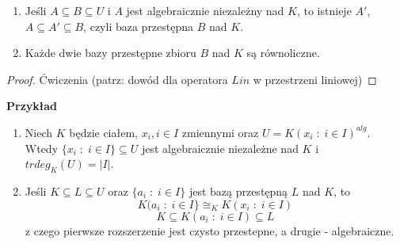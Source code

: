 \begin{theorem}$ $

\begin{enumerate}
    \item Jeśli $A\subseteq B\subseteq U$ i $A$ jest algebraicznie niezależny nad $K$, to istnieje $A'$, $A\subseteq A'\subseteq B$, czyli baza przestępna $B$ nad $K$.
    \item Każde dwie bazy przestępne zbioru $B$ nad $K$ są równoliczne.
\end{enumerate}
\end{theorem}
\begin{proof}
Ćwiczenia (patrz: dowód dla operatora $Lin$ w przestrzeni liniowej)
\end{proof}

\textbf{Przykład}
\begin{enumerate}
    \item Niech $K$ będzie ciałem, $x_i, i\in I$ zmiennymi oraz $U=K(x_i\;:\;i\in I)^{alg}$. Wtedy $\{x_i\;:\;i\in I\}\subseteq U$ jest algebraicznie niezależne nad $K$ i $trdeg_K(U)=|I|$.
    \item Jeśli $K\subseteq L\subseteq U$ oraz $\{a_i\;:\;i\in I\}$ jest bazą przestępną $L$ nad $K$, to
    $$K(a_i\;:\;i\in I\}\cong_KK(x_i\;:\;i\in I)$$
    $$K\subseteq K(a_i\;:\;i\in I)\subseteq L$$
    z czego pierwsze rozszerzenie jest czysto przestepne, a drugie - algebraiczne.
\end{enumerate}

